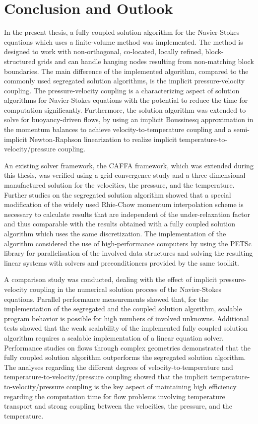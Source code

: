 \chapter{Conclusion and Outlook}
\label{sec:conclusion}

In the present thesis, a fully coupled solution algorithm for the Navier-Stokes equations which uses a finite-volume method was implemented. The method is designed to work with non-orthogonal, co-located, locally refined, block-structured grids and can handle hanging nodes resulting from non-matching block boundaries. The main difference of the implemented algorithm, compared to the commonly used segregated solution algorithms, is the implicit pressure-velocity coupling. The pressure-velocity coupling is a characterizing aspect of solution algorithms for Navier-Stokes equations with the potential to reduce the time for computation significantly. Furthermore, the solution algorithm was extended to solve for buoyancy-driven flows, by using an implicit Boussinesq approximation in the momentum balances to achieve velocity-to-temperature coupling and a semi-implicit Newton-Raphson linearization to realize implicit temperature-to-velocity/pressure coupling.

An existing solver framework, the CAFFA framework, which was extended during this thesis, was verified using a grid convergence study and a three-dimensional manufactured solution for the velocities, the pressure, and the temperature. Further studies on the segregated solution algorithm showed that a special modification of the widely used Rhie-Chow momentum interpolation scheme is necessary to calculate results that are independent of the under-relaxation factor and thus comparable with the results obtained with a fully coupled solution algorithm which uses the same discretization. The implementation of the algorithm considered the use of high-performance computers by using the PETSc library for parallelisation of the involved data structures and solving the resulting linear systems with solvers and preconditioners provided by the same toolkit.

A comparison study was conducted, dealing with the effect of implicit pressure-velocity coupling in the numerical solution process of the Navier-Stokes equations. Parallel performance measurements showed that, for the implementation of the segregated and the coupled solution algorithm, scalable program behavior is possible for high numbers of involved unknowns. Additional tests showed that the weak scalability of the implemented fully coupled solution algorithm requires a scalable implementation of a linear equation solver. Performance studies on flows through complex geometries demonstrated that the fully coupled solution algorithm outperforms the segregated solution algorithm. The analyses regarding the different degrees of velocity-to-temperature and temperature-to-velocity/pressure coupling showed that the implicit temperature-to-velocity/pressure coupling is the key aspect of maintaining high efficiency regarding the computation time for flow problems involving temperature transport and strong coupling between the velocities, the pressure, and the temperature.

